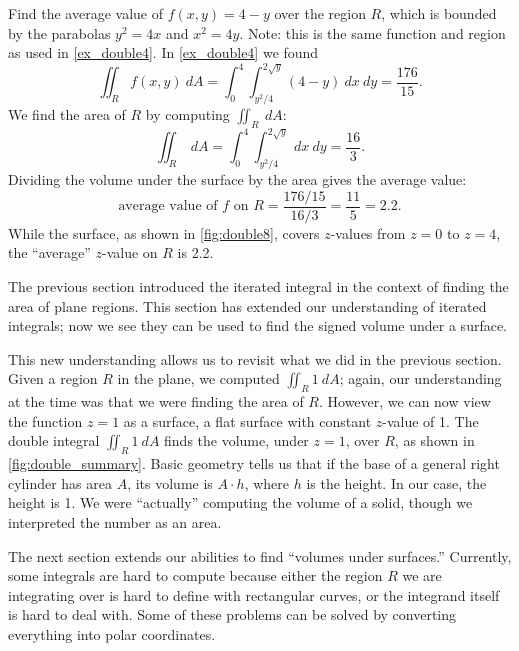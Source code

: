 \begin{example}\label{ex_double8}
Find the average value of $f(x,y) = 4-y$ over the region $R$, which is bounded by the parabolas $y^2=4x$ and $x^2=4y$. Note: this is the same function and region as used in \autoref{ex_double4}.
\solution
In \autoref{ex_double4} we found 
\[\iint_R f(x,y)\ dA = \int_0^4\int_{y^2/4}^{2\sqrt{y}}(4-y)\ dx\ dy = \frac{176}{15}.\] 
We find the area of $R$ by computing $\iint_R \ dA$:
\[\iint_R \ dA = \int_0^4\int_{y^2/4}^{2\sqrt{y}} \ dx\ dy = \frac{16}{3}.\]
%
%
%
Dividing the volume under the surface by the area gives the average value:
\[\text{average value of $f$ on $R$} = \frac{176/15}{16/3} = \frac{11}5 = 2.2.\]
While the surface, as shown in \autoref{fig:double8}, covers $z$-values from $z=0$ to $z=4$, the ``average'' $z$-value on $R$ is 2.2.
\end{example}

The previous section introduced the iterated integral in the context of finding the area of plane regions. This section has extended our understanding of iterated integrals; now we see they can be used to find the signed volume under a surface. 

This new understanding allows us to revisit what we did in the previous section. Given a region $R$ in the plane, we computed $\iint_R 1\ dA$; again, our understanding at the time was that we were finding the area of $R$. However, we can now view the function $z=1$ as a surface, a flat surface with constant $z$-value of 1. The double integral $\iint_R 1\ dA$ finds the volume, under $z=1$, over $R$, as shown in \autoref{fig:double_summary}. Basic geometry tells us that if the base of a general right cylinder has area $A$, its volume is $A\cdot h$, where $h$ is the height. In our case, the height is 1. We were ``actually'' computing the volume of a solid, though we interpreted the number as an area.


The next section extends our abilities to find ``volumes under surfaces.'' Currently, some integrals are hard to compute because either the region $R$ we are integrating over is hard to define with rectangular curves, or the integrand itself is hard to deal with. Some of these problems can be solved by converting everything into polar coordinates.

